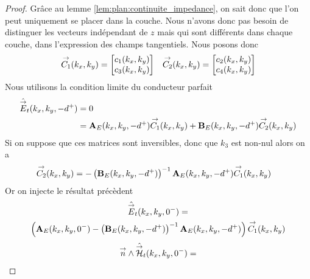         \begin{proof}
            Grâce au lemme \eqref{lem:plan:continuite_impedance}, on sait donc que l'on peut uniquement se placer dans la couche. Nous n'avons donc pas besoin de distinguer les vecteurs indépendant de \(z\) mais qui sont différents dans chaque couche, dans l'expression des champs tangentiels. Nous posons donc
            \begin{align*}
                {\overset{\rightarrow}{C_1}}(k_x,k_y) = \begin{bmatrix}c_1(k_x,k_y) \\ c_3(k_x,k_y)\end{bmatrix} 
                && 
                {\overset{\rightarrow}{C_2}}(k_x,k_y) = \begin{bmatrix}c_2(k_x,k_y) \\ c_4(k_x,k_y)\end{bmatrix}
            \end{align*}
            Nous utilisons la condition limite du conducteur parfait
            \begin{align*}
                \hat{{\overset{\rightarrow}{E}}}_t(k_x,k_y,-d^+) &= 0
                \\
                &=  \mathbf{A}_E(k_x,k_y,-d^+){\overset{\rightarrow}{C_1}}(k_x,k_y) + \mathbf{B}_E(k_x,k_y,-d^+){\overset{\rightarrow}{C_2}}(k_x,k_y)
            \end{align*}
            Si on suppose que ces matrices sont inversibles, donc que \(k_3\) est non-nul alors on a
            \begin{align*}
                {\overset{\rightarrow}{C_2}}(k_x,k_y) &= -\left(\mathbf{B}_E(k_x,k_y,-d^+)\right)^{-1}\mathbf{A}_E(k_x,k_y,-d^+){\overset{\rightarrow}{C_1}}(k_x,k_y)
            \end{align*}
            Or on injecte le résultat précèdent
            \begin{multline*}
                \hat {{\overset{\rightarrow}{E}}}_t(k_x,k_y,0^-) =
                \\
                \left(\mathbf{A}_E(k_x,k_y,0^-)-\left(\mathbf{B}_E(k_x,k_y,-d^+)\right)^{-1}\mathbf{A}_E(k_x,k_y,-d^+)\right){\overset{\rightarrow}{C_1}}(k_x,k_y)
            \end{multline*}
            \begin{multline*}
                \vn \pvect \hat \vH_t(k_x,k_y,0^-) =
                \\

\end{multline*}
\end{proof}
